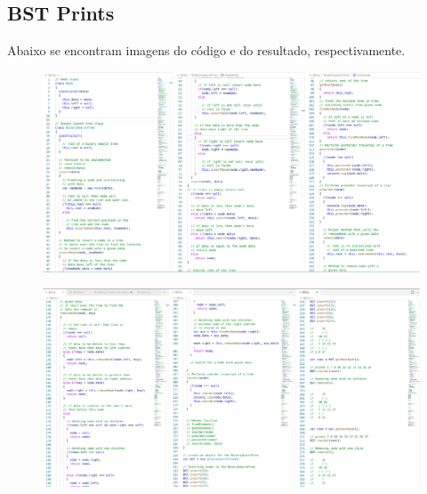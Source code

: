     \subsection{BST Prints}
    Abaixo se encontram imagens do código e do resultado, respectivamente.
    \begin{figure}[h]
    	\centering
    	\includegraphics[width=1\linewidth]{Pictures/BST_Code1}
    	\caption{}
    	\label{fig:bstcode1}
    \end{figure}
    \begin{figure}[h]
    	\centering
    	\includegraphics[width=1\linewidth]{Pictures/BST_Code2}
    	\caption{}
    	\label{fig:bstcode2}
    \end{figure}
